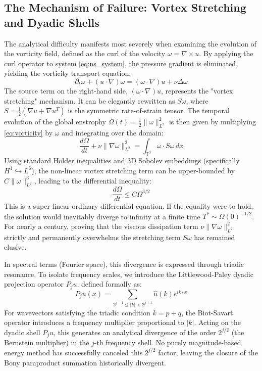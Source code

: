 \documentclass[12pt,a4paper]{article}
\theoremstyle{plain}
\theoremstyle{definition}
\theoremstyle{remark}
\begin{document}
\subsection{The Mechanism of Failure: Vortex Stretching and Dyadic Shells}
The analytical difficulty manifests most severely when examining the evolution of the vorticity field, defined as the curl of the velocity $\omega = \nabla \times u$. By applying the curl operator to system \eqref{eq:ns_system}, the pressure gradient is eliminated, yielding the vorticity transport equation:
\begin{equation}\label{eq:vorticity}
    \partial_t \omega + (u \cdot \nabla)\omega = (\omega \cdot \nabla)u + \nu \Delta \omega
\end{equation}
The source term on the right-hand side, $(\omega \cdot \nabla)u$, represents the "vortex stretching" mechanism. It can be elegantly rewritten as $S \omega$, where $S = \frac{1}{2}(\nabla u + \nabla u^T)$ is the symmetric rate-of-strain tensor. The temporal evolution of the global enstrophy $\Omega(t) = \frac{1}{2} \|\omega\|_{L^2}^2$ is then given by multiplying \eqref{eq:vorticity} by $\omega$ and integrating over the domain:
\begin{equation}
    \frac{d\Omega}{dt} + \nu \|\nabla \omega\|_{L^2}^2 = \int_{\mathbb{T}^3} \omega \cdot S \omega \, dx
\end{equation}
Using standard Hölder inequalities and 3D Sobolev embeddings (specifically $H^1 \hookrightarrow L^6$), the non-linear vortex stretching term can be upper-bounded by $C \|\omega\|_{L^2}^3$, leading to the differential inequality:
\begin{equation}
    \frac{d\Omega}{dt} \leq C \Omega^{3/2}
\end{equation}
This is a super-linear ordinary differential equation. If the equality were to hold, the solution would inevitably diverge to infinity at a finite time $T^* \sim \Omega(0)^{-1/2}$. For nearly a century, proving that the viscous dissipation term $\nu \|\nabla \omega\|_{L^2}^2$ strictly and permanently overwhelms the stretching term $S\omega$ has remained elusive. 

In spectral terms (Fourier space), this divergence is expressed through triadic resonance. To isolate frequency scales, we introduce the Littlewood-Paley dyadic projection operator $P_j u$, defined formally as:
\begin{equation}
    P_j u(x) = \sum_{2^{j-1} \leq |k| < 2^{j+1}} \hat{u}(k) e^{i k \cdot x}
\end{equation}
For wavevectors satisfying the triadic condition $k = p + q$, the Biot-Savart operator introduces a frequency multiplier proportional to $|k|$. Acting on the dyadic shell $P_j u$, this generates an analytical divergence of the order $2^{j/2}$ (the Bernstein multiplier) in the $j$-th frequency shell. No purely magnitude-based energy method has successfully canceled this $2^{j/2}$ factor, leaving the closure of the Bony paraproduct summation historically divergent.
\end{document}
